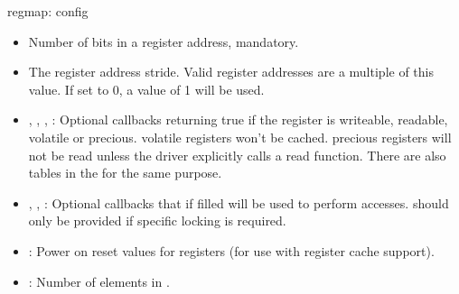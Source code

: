 \begin{frame}[fragile]{regmap: config}
  \begin{itemize}
  \item {} Number of bits in a register address, mandatory.
  \item {} The register address stride. Valid register
    addresses are a multiple of this value. If set to 0, a value of 1
    will be used.
  \item {}, ,
    , : Optional callbacks
    returning true if the register is writeable, readable, volatile or
    precious. volatile registers won't be cached. precious registers
    will not be read unless the driver explicitly calls a read
    function. There are also tables in the 
    for the same purpose.
  \item {}, , :
    Optional callbacks that if filled will be used to perform
    accesses.  should only be provided if
    specific locking is required.
  \item {}: Power on reset values for registers (for
    use with register cache support).
  \item {}: Number of elements in
    .
  \end{itemize}
\end{frame}

